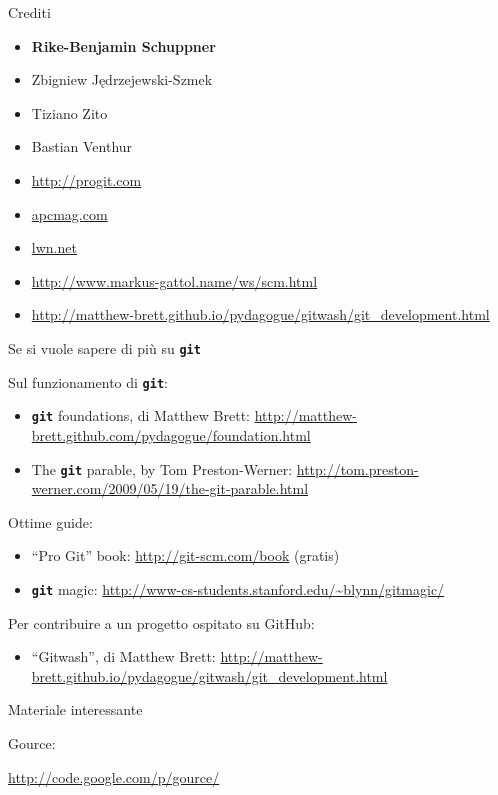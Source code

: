 \documentclass{beamer}
\newcommand{\git}{\texttt{\textbf{git}}\xspace}
\begin{document}
\begin{frame}{\centerline{Crediti}}
  \begin{itemize}
  \item \textbf{Rike-Benjamin Schuppner}
  \item Zbigniew J\k{e}drzejewski-Szmek
  \item Tiziano Zito
  \item Bastian Venthur
  \item \url{http://progit.com}
  \item \url{apcmag.com}
  \item \url{lwn.net}
  \item \url{http://www.markus-gattol.name/ws/scm.html}
  \item \url{http://matthew-brett.github.io/pydagogue/gitwash/git_development.html}
  \end{itemize}
\end{frame}

\begin{frame}{\centerline{Se si vuole sapere di pi\`{u} su \git}}
  Sul funzionamento di \git :
  \begin{itemize}
  \item \git foundations, di Matthew Brett:
    \small
    \url{http://matthew-brett.github.com/pydagogue/foundation.html}
  \item  The \git parable, by Tom Preston-Werner:
    \small
  \url{http://tom.preston-werner.com/2009/05/19/the-git-parable.html}
  \end{itemize}
  Ottime guide:
  \begin{itemize}
  \item ``Pro Git'' book: \url{http://git-scm.com/book} (gratis)
  \item \git magic: \url{http://www-cs-students.stanford.edu/~blynn/gitmagic/}
  \end{itemize}
  Per contribuire a un progetto ospitato su  GitHub:
  \begin{itemize}
  \item ``Gitwash'', di Matthew Brett:
    \small
    \url{http://matthew-brett.github.io/pydagogue/gitwash/git_development.html}
  \end{itemize}
\end{frame}

\begin{frame}{\centerline{Materiale interessante}}
Gource:
  \begin{center}
    \url{http://code.google.com/p/gource/}
  \end{center}
\end{frame}
\end{document}
